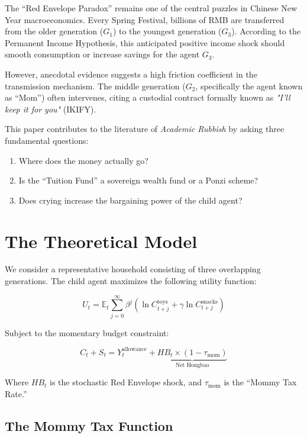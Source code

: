 \documentclass[AER]{AEA}
\begin{document}

The ``Red Envelope Paradox'' remains one of the central puzzles in Chinese New Year macroeconomics. Every Spring Festival, billions of RMB are transferred from the older generation ($G_1$) to the youngest generation ($G_3$). According to the Permanent Income Hypothesis, this anticipated positive income shock should smooth consumption or increase savings for the agent $G_3$.

However, anecdotal evidence suggests a high friction coefficient in the transmission mechanism. The middle generation ($G_2$, specifically the agent known as ``Mom'') often intervenes, citing a custodial contract formally known as \textit{"I'll keep it for you"} (IKIFY).

This paper contributes to the literature of \textit{Academic Rubbish} by asking three fundamental questions:
\begin{enumerate}
    \item Where does the money actually go?
    \item Is the ``Tuition Fund'' a sovereign wealth fund or a Ponzi scheme?
    \item Does crying increase the bargaining power of the child agent?
\end{enumerate}

\section{The Theoretical Model}

We consider a representative household consisting of three overlapping generations. The child agent maximizes the following utility function:

\begin{equation}
    U_t = \mathbb{E}_t \sum_{j=0}^{\infty} \beta^j \left( \ln C_{t+j}^{\text{toys}} + \gamma \ln C_{t+j}^{\text{snacks}} \right)
\end{equation}

Subject to the momentary budget constraint:

\begin{equation}
    C_t + S_t = Y_t^{\text{allowance}} + \underbrace{HB_t \times (1 - \tau_{\text{mom}})}_{\text{Net Hongbao}}
\end{equation}

Where $HB_t$ is the stochastic Red Envelope shock, and $\tau_{\text{mom}}$ is the ``Mommy Tax Rate.''

\subsection{The Mommy Tax Function}
\end{document}
